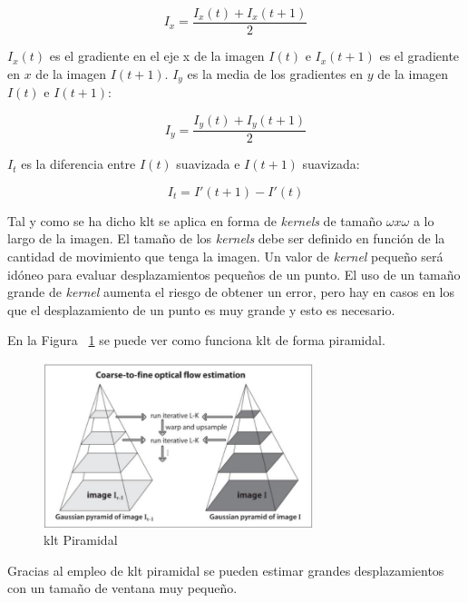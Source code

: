 \begin{equation}
    I_x = \frac{I_x(t)+I_x(t+1)}{2}
\end{equation}

$I_x(t)$ es el gradiente en el eje x de la imagen $I(t)$ e $I_x(t+1)$ es el gradiente en $x$ de la imagen $I(t+1)$. $I_y$ es la media de los gradientes en $y$ de la imagen $I(t)$ e $I(t+1)$:

\begin{equation}
    I_y = \frac{I_y(t)+I_y(t+1)}{2}
\end{equation}

$I_t$ es la diferencia entre $I(t)$ suavizada e $I(t+1)$ suavizada:

\begin{equation}
   I_t = I'(t+1) - I'(t) 
\end{equation}

Tal y como se ha dicho \acrshort{klt} se aplica en forma de \textit{kernels} de tamaño $\omega x \omega$ a lo largo de la imagen. El tamaño de los \textit{kernels} debe ser definido en función de la cantidad de movimiento que tenga la imagen. Un valor de \textit{kernel} pequeño será idóneo para evaluar desplazamientos pequeños de un punto. El uso de un tamaño grande de \textit{kernel} aumenta el riesgo de obtener un error, pero hay en casos en los que el desplazamiento de un punto es muy grande y esto es necesario.

En la Figura ~\ref{fig.klt_piramidal} se puede ver como funciona \acrshort{klt} de forma piramidal.

 \begin{figure}[H] 
\begin{center}
	\includegraphics[width=0.7\textwidth]{figures/Diseno_global/klt_piramidal.png}
   \caption{\acrshort{klt} Piramidal}
	\label{fig.klt_piramidal}
\end{center}
\end{figure}

Gracias al empleo de \acrshort{klt} piramidal se pueden estimar grandes desplazamientos con un tamaño de ventana muy pequeño.

